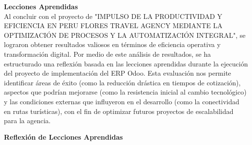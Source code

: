 \documentclass[11pt]{article}
\begin{document}
\textbf{Lecciones Aprendidas}\\
Al concluir con el proyecto de "IMPULSO DE LA PRODUCTIVIDAD Y EFICIENCIA EN PERU FLORES TRAVEL AGENCY MEDIANTE LA OPTIMIZACIÓN DE PROCESOS Y LA AUTOMATIZACIÓN INTEGRAL", se lograron obtener resultados valiosos en términos de eficiencia operativa y transformación digital. Por medio de este análisis de resultados, se ha estructurado una reflexión basada en las lecciones aprendidas durante la ejecución del proyecto de implementación del ERP Odoo. Esta evaluación nos permite identificar áreas de éxito (como la reducción drástica en tiempos de cotización), aspectos que podrían mejorarse (como la resistencia inicial al cambio tecnológico) y las condiciones externas que influyeron en el desarrollo (como la conectividad en rutas turísticas), con el fin de optimizar futuros proyectos de escalabilidad para la agencia.

\newpage
\textbf{Reflexión de Lecciones Aprendidas}
\end{document}
